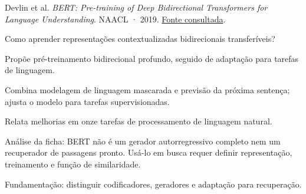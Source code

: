 {\small Devlin et al. \textit{{BERT}: Pre-training of Deep Bidirectional Transformers for Language Understanding}. NAACL · 2019. \href{https://aclanthology.org/N19-1423.pdf}{Fonte consultada}.\par}

Como aprender representações contextualizadas bidirecionais transferíveis?

Propõe pré-treinamento bidirecional profundo, seguido de adaptação para tarefas de linguagem.

Combina modelagem de linguagem mascarada e previsão da próxima sentença; ajusta o modelo para tarefas supervisionadas.

Relata melhorias em onze tarefas de processamento de linguagem natural.

\begin{itemize}
\end{itemize}

Análise da ficha: BERT não é um gerador autorregressivo completo nem um recuperador de passagens pronto. Usá-lo em busca requer definir representação, treinamento e função de similaridade.

Fundamentação: distinguir codificadores, geradores e adaptação para recuperação.

